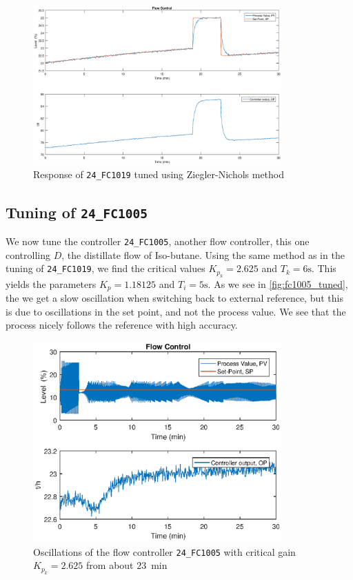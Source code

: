 \begin{figure}[ht!]
	\centering
	\includegraphics[width=0.85\textwidth]{fig/tuning/FC1019_tuned.eps}
	\caption{Response of \texttt{24\_FC1019} tuned using Ziegler-Nichols method}
	\label{fig:fc1019_tuned}
\end{figure}

\subsection{Tuning of \texttt{24\_FC1005}}
We now tune the controller \texttt{24\_FC1005}, another flow controller, this one controlling $D$, the distillate flow of Iso-butane. Using the same method as in the tuning of \texttt{24\_FC1019}, we find the critical values $K_{p_k} = 2.625$ and $T_k = 6 \si{\second}$. This yields the parameters $K_p = 1.18125$ and $T_i = 5 \si{\second}$. As we see in \autoref{fig:fc1005_tuned}, the we get a slow oscillation when switching back to external reference, but this is due to oscillations in the set point, and not the process value. We see that the process nicely follows the reference with high accuracy.

\begin{figure}[ht!]
	\centering
	\includegraphics[width=0.85\textwidth]{fig/tuning/FC1005_critical.eps}
	\caption{Oscillations of the flow controller \texttt{24\_FC1005} with critical gain $K_{p_k} = 2.625$ from about $\SI{23}{\min}$}
	\label{fig:fc1005_oscillations}
\end{figure}

